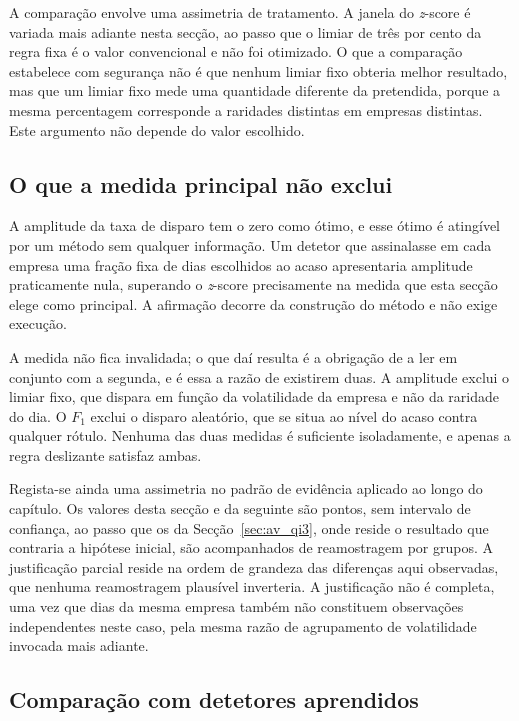 A comparação envolve uma assimetria de tratamento. A janela do \emph{z}-score é variada mais adiante
nesta secção, ao passo que o limiar de três por cento da regra fixa é o valor convencional e não foi
otimizado. O que a comparação estabelece com segurança não é que nenhum limiar fixo obteria melhor
resultado, mas que um limiar fixo mede uma quantidade diferente da pretendida, porque a mesma
percentagem corresponde a raridades distintas em empresas distintas. Este argumento não depende do
valor escolhido.

\subsection{O que a medida principal não exclui}

A amplitude da taxa de disparo tem o zero como ótimo, e esse ótimo é atingível por um método sem
qualquer informação. Um detetor que assinalasse em cada empresa uma fração fixa de dias escolhidos
ao acaso apresentaria amplitude praticamente nula, superando o \emph{z}-score precisamente na medida
que esta secção elege como principal. A afirmação decorre da construção do método e não exige
execução.

A medida não fica invalidada; o que daí resulta é a obrigação de a ler em conjunto com a
segunda, e é essa a razão de existirem duas. A amplitude exclui o limiar fixo, que dispara em função da
volatilidade da empresa e não da raridade do dia. O $F_1$ exclui o disparo aleatório, que se situa
ao nível do acaso contra qualquer rótulo. Nenhuma das duas medidas é suficiente isoladamente, e
apenas a regra deslizante satisfaz ambas.


Regista-se ainda uma assimetria no padrão de evidência aplicado ao longo do capítulo. Os valores
desta secção e da seguinte são pontos, sem intervalo de confiança, ao passo que os da
Secção~\ref{sec:av_qi3}, onde reside o resultado que contraria a hipótese inicial, são acompanhados
de reamostragem por grupos. A justificação parcial reside na ordem de grandeza das diferenças aqui
observadas, que nenhuma reamostragem plausível inverteria. A justificação não é completa, uma vez
que dias da mesma empresa também não constituem observações independentes neste caso, pela mesma
razão de agrupamento de volatilidade invocada mais adiante.

\subsection{Comparação com detetores aprendidos}

